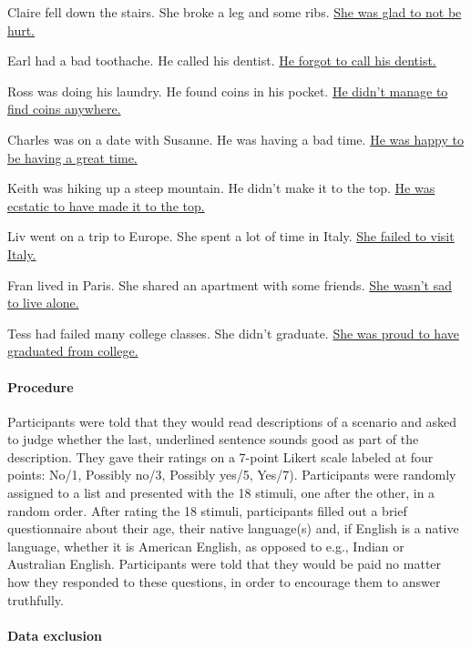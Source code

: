 \documentclass[11pt,fleqn]{article}
\newcommand{\6}{\mbox{$[\hspace*{-.6mm}[$}}
\newcommand{\9}{\mbox{$]\hspace*{-.6mm}]$}}
\begin{document}
\begin{exe} 
\ex\label{claire} 
\begin{xlist}
\ex Claire fell down the stairs. She broke a leg and some ribs. \uline{She was glad to not be hurt.} 

\ex Earl had a bad toothache. He called his dentist. \uline{He forgot to call his dentist.}

\ex Ross was doing his laundry. He found coins in his pocket. \uline{He didn't manage to find coins anywhere.}

\ex Charles was on a date with Susanne. He was having a bad time. \uline{He was happy to be having a great time.}

\ex Keith was hiking up a steep mountain. He didn't make it to the top. \uline{He was ecstatic to have made it to the top.}

\ex Liv went on a trip to Europe. She spent a lot of time in Italy. \uline{She failed to visit Italy.}

\ex Fran lived in Paris. She shared an apartment with some friends. \uline{She wasn't sad to live alone.}

\ex Tess had failed many college classes. She didn't graduate. \uline{She was proud to have graduated from college.}

\end{xlist}
\end{exe}


\paragraph{Procedure} Participants were told that they would read descriptions of a scenario and asked to judge whether the last, underlined sentence sounds good as part of the description. They gave their ratings on a 7-point Likert scale
labeled at four points: No/1, Possibly no/3, Possibly yes/5,
Yes/7). Participants were randomly assigned to a list and presented with the 18 stimuli, one after the other, in a random order. After rating the 18 stimuli, participants filled out a brief questionnaire about their age, their native language(s) and, if English is a native language, whether it is American English, as opposed to e.g., Indian or Australian English.
Participants were told that they would be paid no matter how they
responded to these questions, in order to encourage them to answer
truthfully.


\paragraph{Data exclusion} 
\end{document}
